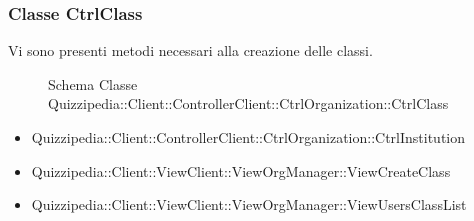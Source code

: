 \subsubsection{Classe CtrlClass}
Vi sono presenti metodi necessari alla creazione delle classi.
\begin{figure}[H]
\centering
\noindent{}
\caption[Schema Classe CtrlClass]{Schema Classe Quizzipedia::Client::ControllerClient::CtrlOrganization::CtrlClass}
\end{figure}
\begin{itemize}
\item Quizzipedia::Client::ControllerClient::CtrlOrganization::CtrlInstitution
\item Quizzipedia::Client::ViewClient::ViewOrgManager::ViewCreateClass
\item Quizzipedia::Client::ViewClient::ViewOrgManager::ViewUsersClassList
\end{itemize}
